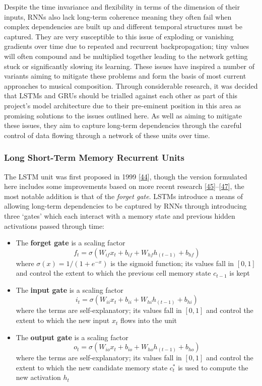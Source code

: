 \documentclass[12pt,]{article}
\providecommand{\tightlist}{%
  \setlength{\itemsep}{0pt}\setlength{\parskip}{0pt}}
\begin{document}
Despite the time invariance and flexibility in terms of the dimension of
their inputs, RNNs also lack long-term coherence meaning they often fail
when complex dependencies are built up and different temporal structures
must be captured. They are very susceptible to this issue of exploding
or vanishing gradients over time due to repeated and recurrent
backpropagation; tiny values will often compound and be multiplied
together leading to the network getting stuck or significantly slowing
its learning. These issues have inspired a number of variants aiming to
mitigate these problems and form the basis of most current approaches to
musical composition. Through considerable research, it was decided that
LSTMs and GRUs should be trialled against each other as part of this
project's model architecture due to their pre-eminent position in this
area as promising solutions to the issues outlined here. As well as
aiming to mitigate these issues, they aim to capture long-term
dependencies through the careful control of data flowing through a
network of these units over time.

\hypertarget{long-short-term-memory-recurrent-units}{%
\subsubsection{Long Short-Term Memory Recurrent
Units}\label{long-short-term-memory-recurrent-units}}

The LSTM unit was first proposed in 1999
{[}\protect\hyperlink{ref-gers1999learning}{44}{]}, though the version
formulated here includes some improvements based on more recent research
{[}\protect\hyperlink{ref-sak2014long}{45}{]}--{[}\protect\hyperlink{ref-zebin2018human}{47}{]},
the most notable addition is that of the \emph{forget gate}. LSTMs
introduce a means of allowing long-term dependencies to be captured by
RNNs through introducing three `gates' which each interact with a memory
state and previous hidden activations passed through time:

\begin{itemize}
\tightlist
\item
  The \textbf{forget gate} is a scaling factor
  \[f_t = \sigma(W_{if} x_t + b_{if} + W_{hf} h_{(t-1)} + b_{hf})\]
  where \(\sigma(x) = 1 / (1 + e^{-x})\) is the sigmoid function; its
  values fall in \([0,1]\) and control the extent to which the previous
  cell memory state \(c_{t-1}\) is kept
\item
  The \textbf{input gate} is a scaling factor
  \[i_t = \sigma(W_{ii} x_t + b_{ii} + W_{hi} h_{(t-1)} + b_{hi})\]
  where the terms are self-explanatory; its values fall in \([0,1]\) and
  control the extent to which the new input \(x_t\) flows into the unit
\item
  The \textbf{output gate} is a scaling factor
  \[o_t = \sigma(W_{io} x_t + b_{io} + W_{ho} h_{(t-1)} + b_{ho})\]
  where the terms are self-explanatory; its values fall in \([0,1]\) and
  control the extent to which the new candidate memory state \(c^*_t\)
  is used to compute the new activation \(h_t\)
\end{itemize}
\end{document}
